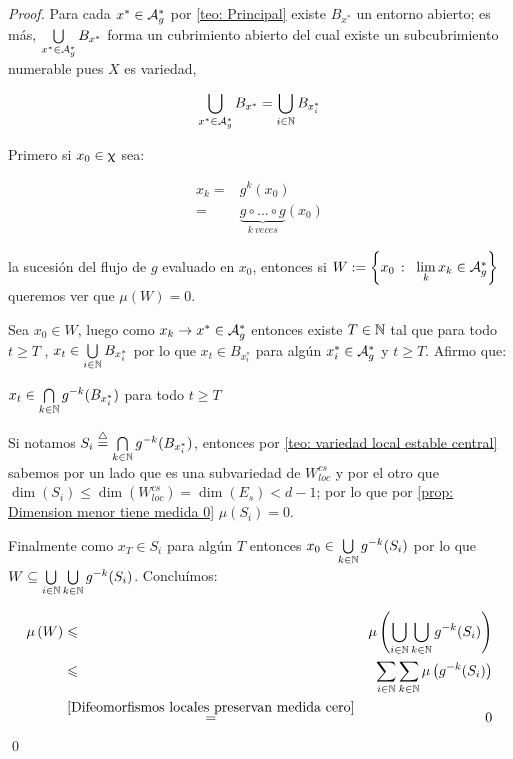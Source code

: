 \begin{proof}
	Para cada $x^* \in \mathcal{A}_{g}^{*}$ por \ref{teo: Principal} existe $B_{x^*}$ un entorno abierto; es m\'as, $\bigcup\limits_{x^* \in \mathcal{A}_{g}^{*}}{B_{x^{*}}}$ forma un cubrimiento abierto del cual existe un subcubrimiento numerable pues $X$ es variedad, \ie
	
	\[
	\bigcup\limits_{x^* \in \mathcal{A}_{g}^{*}}{B_{x^{*}}} = \bigcup\limits_{i \in {\mathbb{N}}}{B_{x^{*}_{i}}}
	\]
	
	Primero si $x_0 \in \upchi$ sea:
	
	\begin{equation*}
	\begin{aligned}
	x_k = & g^k(x_0) \\
	= & \underbrace{g \circ \dots \circ g }_{k \ veces} (x_0)
	\end{aligned}
	\end{equation*}
	
	la sucesi\'on del flujo de $g$ evaluado en $x_0$, entonces si $W := \sett{x_0 \ \colon \ \Biglim{k}{x_k \in \mathcal{A}_g^{*}}}$ queremos ver que $\mu(W) = 0$.
	
	Sea $x_0 \in W$, luego como $x_k \rightarrow x^* \in \mathcal{A}_{g}^{*}$ entonces existe $T \in {\mathbb{N}}$ tal que para todo $t \ge T$ , $x_t \in  \bigcup\limits_{i \in {\mathbb{N}}}{B_{x^{*}_{i}}}$ por lo que $x_t \in B_{x^{*}_{i}}$ para alg\'un $x_{i}^{*} \in \mathcal{A}_{g}^{*}$ y $t \ge T$. Afirmo que:
	
	
	\begin{lemma}
		\label{lemma: teo_principal}
		$x_t \in \bigcap\limits_{k \in {\mathbb{N}}}{g^{-k}(B_{x_{i}^{*}})}$ para todo $t \ge T$
	\end{lemma}
	
	Si notamos $S_i \stackrel{\triangle}{=} \bigcap\limits_{k \in {\mathbb{N}}}{g^{-k}(B_{x_{i}^{*}})}$, entonces por \ref{teo: variedad local estable central} sabemos por un lado que es una subvariedad de $W_{loc}^{cs}$ y por el otro que $\dim(S_i) \le \dim(W_{loc}^{cs}) = \dim(E_s) < d-1$; por lo que por \ref{prop: Dimension menor tiene medida 0} $\mu(S_i) = 0$.
	
	Finalmente como $x_{T} \in S_i$ para alg\'un $T$ entonces $x_0 \in \bigcup\limits_{k \in {\mathbb{N}}}{g^{-k}(S_i)}$ por lo que $W \subseteq \bigcup\limits_{i \in {\mathbb{N}}}{\bigcup\limits_{k \in {\mathbb{N}}}{g^{-k}(S_i)}}$. Conclu\'imos:
	
	\begin{equation*}
	\begin{aligned}
	\mu \left(W\right) & \leqslant & \mu \left(\bigcup\limits_{i \in {\mathbb{N}}}{\bigcup\limits_{k \in {\mathbb{N}}}{g^{-k}(S_i)}} \right) \\
	& \leqslant & \sum\limits_{i \in {\mathbb{N}}}{\sum\limits_{k \in {\mathbb{N}}}{\mu \left(g^{-k}(S_i)\right)}} \\
	& \stackrel{\ref{Difeomorfismos locales preservan medida cero}}{=} & 0
	\end{aligned}
	\end{equation*}\qed
	
	
\end{proof}


